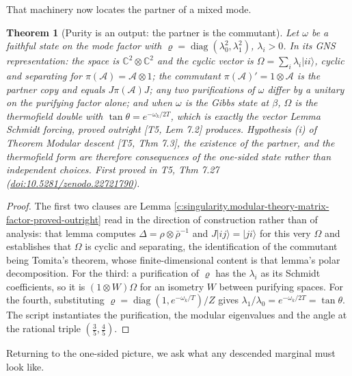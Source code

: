 \documentclass[11pt]{article}
\newtheorem{theorem}{Theorem}[section]
\theoremstyle{definition}
\theoremstyle{plain}
\providecommand{\Aa}{}\renewcommand{\Aa}{\mathcal{A}}
\providecommand{\C}{}\renewcommand{\C}{\mathbb{C}}
\begin{document}
That machinery now locates the partner of a mixed mode.

\begin{theorem}[Purity is an output: the partner is the commutant]\label{c:singularity.purity-output-partner-commutant}
Let $\omega$ be a faithful state on the mode factor with $\varrho = \operatorname{diag}(\lambda_0^{2}, \lambda_1^{2})$, $\lambda_i > 0$. In its GNS representation: the space is $\C^{2}\otimes\C^{2}$ and the cyclic vector is $\Omega = \sum_i \lambda_i|ii\rangle$, cyclic and separating for $\pi(\Aa) = \Aa\otimes 1$; the commutant $\pi(\Aa)' = 1 \otimes \Aa$ is the partner copy and equals $J\pi(\Aa)J$; any two purifications of $\omega$ differ by a unitary on the purifying factor alone; and when $\omega$ is the Gibbs state at $\beta$, $\Omega$ is the thermofield double with $\tan\theta = e^{-\omega_k/2T}$, which is exactly the vector Lemma \emph{Schmidt forcing, proved outright} [T5, Lem 7.2] produces. Hypothesis (i) of Theorem \emph{Modular descent} [T5, Thm 7.3], the existence of the partner, and the thermofield form are therefore consequences of the one-sided state rather than independent choices.
\emph{First proved in} T5, Thm 7.27 (\href{https://doi.org/10.5281/zenodo.22721790}{doi:10.5281/zenodo.22721790}).
\end{theorem}
\begin{proof}
The first two clauses are Lemma \ref{c:singularity.modular-theory-matrix-factor-proved-outright} read in the direction of construction rather than of analysis: that lemma computes $\Delta = \rho\otimes\bar\rho^{-1}$ and $J|ij\rangle = |ji\rangle$ for this very $\Omega$ and establishes that $\Omega$ is cyclic and separating, the identification of the commutant being Tomita's theorem, whose finite-dimensional content is that lemma's polar decomposition. For the third: a purification of $\varrho$ has the $\lambda_i$ as its Schmidt coefficients, so it is $(1\otimes W)\Omega$ for an isometry $W$ between purifying spaces. For the fourth, substituting $\varrho = \operatorname{diag}(1, e^{-\omega_k/T})/Z$ gives $\lambda_1/\lambda_0 = e^{-\omega_k/2T} = \tan\theta$. The script instantiates the purification, the modular eigenvalues and the angle at the rational triple $(\tfrac35, \tfrac45)$.

\end{proof}

Returning to the one-sided picture, we ask what any descended marginal must look like.
\end{document}
